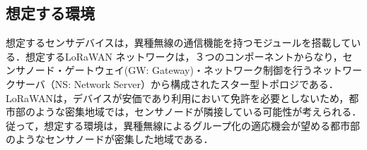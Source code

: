 \subsection{想定する環境}
想定するセンサデバイスは，異種無線の通信機能を持つモジュールを搭載している．想定するLoRaWAN ネットワークは，３つのコンポーネントからなり，センサノード・ゲートウェイ(GW: Gateway)・ネットワーク制御を行うネットワークサーバ（NS: Network Server）から構成されたスター型トポロジである．LoRaWANは，デバイスが安価であり利用において免許を必要としないため，都市部のような密集地域では，センサノードが隣接している可能性が考えられる．従って，想定する環境は，異種無線によるグループ化の適応機会が望める都市部のようなセンサノードが密集した地域である．